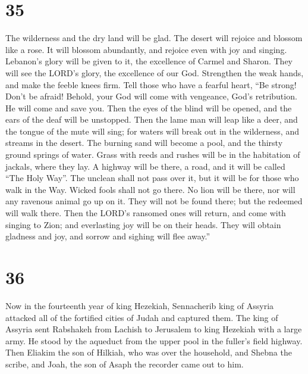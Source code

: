 \hypertarget{section-34}{%
\section{35}\label{section-34}}

 The wilderness and the dry land will be glad. The desert
will rejoice and blossom like a rose.  It will blossom
abundantly, and rejoice even with joy and singing. Lebanon's glory will
be given to it, the excellence of Carmel and Sharon. They will see the
LORD's glory, the excellence of our God.  Strengthen the
weak hands, and make the feeble knees firm.  Tell those who
have a fearful heart, ``Be strong! Don't be afraid! Behold, your God
will come with vengeance, God's retribution. He will come and save you.
 Then the eyes of the blind will be opened, and the ears of
the deaf will be unstopped.  Then the lame man will leap
like a deer, and the tongue of the mute will sing; for waters will break
out in the wilderness, and streams in the desert.  The
burning sand will become a pool, and the thirsty ground springs of
water. Grass with reeds and rushes will be in the habitation of jackals,
where they lay.  A highway will be there, a road, and it
will be called ``The Holy Way''. The unclean shall not pass over it, but
it will be for those who walk in the Way. Wicked fools shall not go
there.  No lion will be there, nor will any ravenous animal
go up on it. They will not be found there; but the redeemed will walk
there.  Then the LORD's ransomed ones will return, and come
with singing to Zion; and everlasting joy will be on their heads. They
will obtain gladness and joy, and sorrow and sighing will flee away.''

\hypertarget{section-35}{%
\section{36}\label{section-35}}

 Now in the fourteenth year of king Hezekiah, Sennacherib
king of Assyria attacked all of the fortified cities of Judah and
captured them.  The king of Assyria sent Rabshakeh from
Lachish to Jerusalem to king Hezekiah with a large army. He stood by the
aqueduct from the upper pool in the fuller's field highway. 
Then Eliakim the son of Hilkiah, who was over the household, and Shebna
the scribe, and Joah, the son of Asaph the recorder came out to him.

